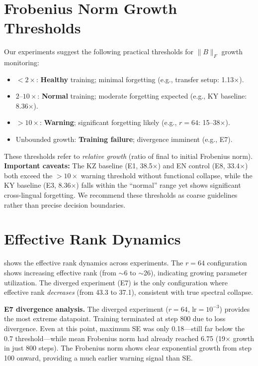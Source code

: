 \documentclass[11pt]{article}
\begin{document}
\section{Frobenius Norm Growth Thresholds}
\label{app:thresholds}

Our experiments suggest the following practical thresholds for $\|B\|_F$ growth monitoring:
\begin{itemize}
    \item $< 2\times$: \textbf{Healthy} training; minimal forgetting (e.g., transfer setup: 1.13$\times$).
    \item $2$--$10\times$: \textbf{Normal} training; moderate forgetting expected (e.g., KY baseline: 8.36$\times$).
    \item $> 10\times$: \textbf{Warning}; significant forgetting likely (e.g., $r{=}64$: 15--38$\times$).
    \item Unbounded growth: \textbf{Training failure}; divergence imminent (e.g., E7).
\end{itemize}

These thresholds refer to \emph{relative growth} (ratio of final to initial Frobenius norm). \textbf{Important caveats:} The KZ baseline (E1, 38.5$\times$) and EN control (E8, 33.4$\times$) both exceed the $>10\times$ warning threshold without functional collapse, while the KY baseline (E3, 8.36$\times$) falls within the ``normal'' range yet shows significant cross-lingual forgetting. We recommend these thresholds as coarse guidelines rather than precise decision boundaries.

\section{Effective Rank Dynamics}
\label{app:effrank}

 shows the effective rank dynamics across experiments. The $r{=}64$ configuration shows increasing effective rank (from $\sim$6 to $\sim$26), indicating growing parameter utilization. The diverged experiment (E7) is the only configuration where effective rank \emph{decreases} (from 43.3 to 37.1), consistent with true spectral collapse.

\textbf{E7 divergence analysis.} The diverged experiment ($r{=}64$, $\text{lr}{=}10^{-3}$) provides the most extreme datapoint. Training terminated at step 800 due to loss divergence. Even at this point, maximum SE was only 0.18---still far below the 0.7 threshold---while mean Frobenius norm had already reached 6.75 (19$\times$ growth in just 800 steps). The Frobenius norm shows clear exponential growth from step 100 onward, providing a much earlier warning signal than SE.
\end{document}
